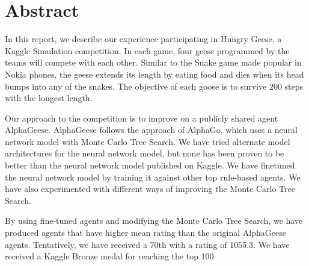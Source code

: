 \section{Abstract}

In this report, we describe our experience participating in Hungry Geese, a Kaggle Simulation competition. In each game, four geese programmed by the teams will compete with each other. Similar to the Snake game made popular in Nokia phones, the geese extends its length by eating food and dies when its head bumps into any of the snakes. The objective of each goose is to survive 200 steps with the longest length.

Our approach to the competition is to improve on a publicly shared agent AlphaGeese. AlphaGeese follows the approach of AlphaGo, which uses a neural network model with Monte Carlo Tree Search. We have tried alternate model architectures for the neural network model, but none has been proven to be better than the neural network model published on Kaggle. We have finetuned the neural network model by training it against other top rule-based agents. We have also experimented with different ways of improving the Monte Carlo Tree Search.

By using fine-tuned agents and modifying the Monte Carlo Tree Search, we have produced agents that have higher mean rating than the original AlphaGeese agents. Tentatively, we have received a 70th with a rating of 1055.3. We have received a Kaggle Bronze medal for reaching the top 100.



